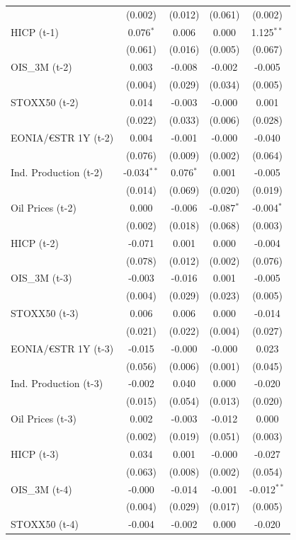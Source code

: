 \begin{longtable}[t]{lcccc}
 & (0.002) & (0.012) & (0.061) & (0.002)\\
HICP (t-1) & 0.076$^{*}$ & 0.006 & 0.000 & 1.125$^{**}$\\
 & (0.061) & (0.016) & (0.005) & (0.067)\\
OIS\_3M (t-2) & 0.003 & -0.008 & -0.002 & -0.005\\
 & (0.004) & (0.029) & (0.034) & (0.005)\\
STOXX50 (t-2) & 0.014 & -0.003 & -0.000 & 0.001\\
 & (0.022) & (0.033) & (0.006) & (0.028)\\
EONIA/€STR 1Y (t-2) & 0.004 & -0.001 & -0.000 & -0.040\\
 & (0.076) & (0.009) & (0.002) & (0.064)\\
Ind. Production (t-2) & -0.034$^{**}$ & 0.076$^{*}$ & 0.001 & -0.005\\
 & (0.014) & (0.069) & (0.020) & (0.019)\\
Oil Prices (t-2) & 0.000 & -0.006 & -0.087$^{*}$ & -0.004$^{*}$\\
 & (0.002) & (0.018) & (0.068) & (0.003)\\
HICP (t-2) & -0.071 & 0.001 & 0.000 & -0.004\\
 & (0.078) & (0.012) & (0.002) & (0.076)\\
OIS\_3M (t-3) & -0.003 & -0.016 & 0.001 & -0.005\\
 & (0.004) & (0.029) & (0.023) & (0.005)\\
STOXX50 (t-3) & 0.006 & 0.006 & 0.000 & -0.014\\
 & (0.021) & (0.022) & (0.004) & (0.027)\\
EONIA/€STR 1Y (t-3) & -0.015 & -0.000 & -0.000 & 0.023\\
 & (0.056) & (0.006) & (0.001) & (0.045)\\
Ind. Production (t-3) & -0.002 & 0.040 & 0.000 & -0.020\\
 & (0.015) & (0.054) & (0.013) & (0.020)\\
Oil Prices (t-3) & 0.002 & -0.003 & -0.012 & 0.000\\
 & (0.002) & (0.019) & (0.051) & (0.003)\\
HICP (t-3) & 0.034 & 0.001 & -0.000 & -0.027\\
 & (0.063) & (0.008) & (0.002) & (0.054)\\
OIS\_3M (t-4) & -0.000 & -0.014 & -0.001 & -0.012$^{**}$\\
 & (0.004) & (0.029) & (0.017) & (0.005)\\
STOXX50 (t-4) & -0.004 & -0.002 & 0.000 & -0.020\\

\end{longtable}
